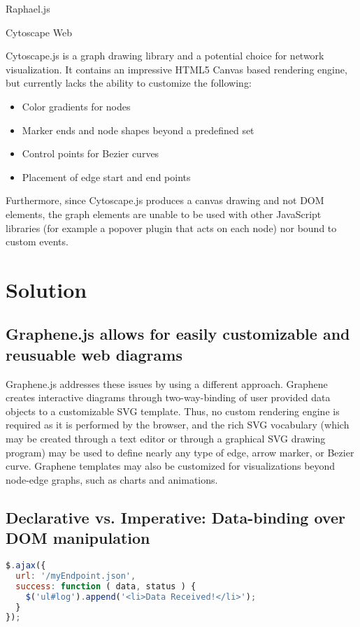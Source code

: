 Raphael.js \autocite{sencha2014raphael}

Cytoscape Web \autocite{cytoscape2014web}

Cytoscape.js \autocite{cytoscape2014js} is a graph drawing library and a potential choice for network visualization. It contains an impressive HTML5 Canvas based rendering engine, but currently lacks the ability to customize the following:

\begin{itemize}
\item Color gradients for nodes
\item Marker ends and node shapes beyond a predefined set
\item Control points for Bezier curves
\item Placement of edge start and end points
\end{itemize}

Furthermore, since Cytoscape.js produces a canvas drawing and not DOM elements, the graph elements are unable to be used with other JavaScript libraries (for example a popover plugin that acts on each node) nor bound to custom events.

\section{Solution}

\subsection{Graphene.js allows for easily customizable and reusuable web diagrams}
Graphene.js addresses these issues by using a different approach. 
Graphene creates interactive diagrams through two-way-binding of user provided data objects to a customizable SVG template.
Thus, no custom rendering engine is required as it is performed by the browser, and the rich SVG vocabulary (which may be created through a text editor or through a graphical SVG drawing program) may be used to define nearly any type of edge, arrow marker, or Bezier curve.
Graphene templates may also be customized for visualizations beyond node-edge graphs, such as charts and animations.

\subsection{Declarative vs. Imperative: Data-binding over DOM manipulation}

\begin{lstlisting}[language=JavaScript]
$.ajax({
  url: '/myEndpoint.json',
  success: function ( data, status ) {
    $('ul#log').append('<li>Data Received!</li>');
  }
});
\end{lstlisting}

